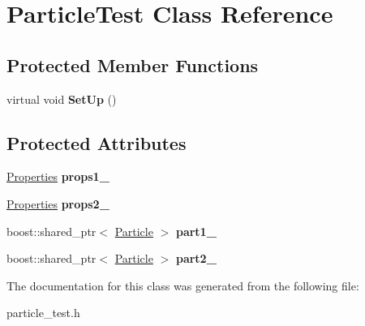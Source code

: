 \hypertarget{classParticleTest}{\section{\-Particle\-Test \-Class \-Reference}
\label{classParticleTest}
}
\subsection*{\-Protected \-Member \-Functions}
\begin{DoxyCompactItemize}
\item 
\hypertarget{classParticleTest_ae25bb940220373a073e9c07c67c00baa}{virtual void {\bfseries \-Set\-Up} ()}\label{classParticleTest_ae25bb940220373a073e9c07c67c00baa}

\end{DoxyCompactItemize}
\subsection*{\-Protected \-Attributes}
\begin{DoxyCompactItemize}
\item 
\hypertarget{classParticleTest_afccef11e35ec5d84ed78e5303a122986}{\hyperlink{structProperties}{\-Properties} {\bfseries props1\-\_\-}}\label{classParticleTest_afccef11e35ec5d84ed78e5303a122986}

\item 
\hypertarget{classParticleTest_afb18ce7d1b4a1c45806680ffd07d9916}{\hyperlink{structProperties}{\-Properties} {\bfseries props2\-\_\-}}\label{classParticleTest_afb18ce7d1b4a1c45806680ffd07d9916}

\item 
\hypertarget{classParticleTest_a078c45476675a658f7fbcf0b72d41a37}{boost\-::shared\-\_\-ptr$<$ \hyperlink{classParticle}{\-Particle} $>$ {\bfseries part1\-\_\-}}\label{classParticleTest_a078c45476675a658f7fbcf0b72d41a37}

\item 
\hypertarget{classParticleTest_a7a0b6a4a56e2ff9c1d2948aae9420033}{boost\-::shared\-\_\-ptr$<$ \hyperlink{classParticle}{\-Particle} $>$ {\bfseries part2\-\_\-}}\label{classParticleTest_a7a0b6a4a56e2ff9c1d2948aae9420033}

\end{DoxyCompactItemize}


\-The documentation for this class was generated from the following file\-:\begin{DoxyCompactItemize}
\item 
particle\-\_\-test.\-h\end{DoxyCompactItemize}
